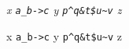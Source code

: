 \documentclass{article}
\begin{document}
\emph{x \lstinline|a_b->c| y \lstinline|p^q&t$u~v| z}

x \lstinline|a_b->c| y \lstinline|p^q&t$u~v| z
\end{document}
